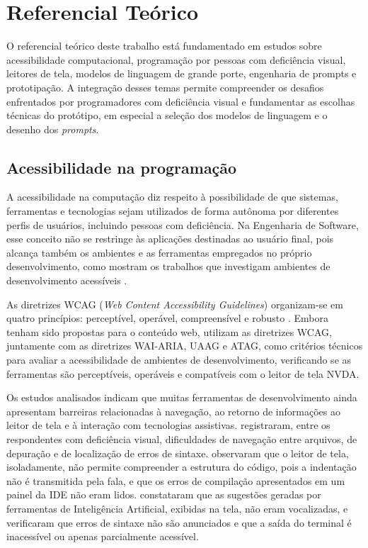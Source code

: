 \documentclass[
    12pt,                   %
    openright,              %
    oneside,                %
    a4paper,                %
    sumario=tradicional,    %
    english,                %
    brazil,                 %
    ]{abntex2}
\begin{document}
\chapter{Referencial Teórico}\label{sec:refteorico}

O referencial teórico deste trabalho está fundamentado em estudos sobre acessibilidade computacional, programação por pessoas com deficiência visual, leitores de tela, modelos de linguagem de grande porte, engenharia de prompts e prototipação. A integração desses temas permite compreender os desafios enfrentados por programadores com deficiência visual e fundamentar as escolhas técnicas do protótipo, em especial a seleção dos modelos de linguagem e o desenho dos \textit{prompts}.

\section{Acessibilidade na programação}\label{sec:AcessComputacao}

A acessibilidade na computação diz respeito à possibilidade de que sistemas, ferramentas e tecnologias sejam utilizados de forma autônoma por diferentes perfis de usuários, incluindo pessoas com deficiência. Na Engenharia de Software, esse conceito não se restringe às aplicações destinadas ao usuário final, pois alcança também os ambientes e as ferramentas empregados no próprio desenvolvimento, como mostram os trabalhos que investigam ambientes de desenvolvimento acessíveis \cite{latinoware37693,latinoware6969}.

As diretrizes WCAG (\textit{Web Content Accessibility Guidelines}) organizam-se em quatro princípios: perceptível, operável, compreensível e robusto \cite{w3c2024wcag22}. Embora tenham sido propostas para o conteúdo web, \textcite{latinoware6969} utilizam as diretrizes WCAG, juntamente com as diretrizes WAI-ARIA, UAAG e ATAG, como critérios técnicos para avaliar a acessibilidade de ambientes de desenvolvimento, verificando se as ferramentas são perceptíveis, operáveis e compatíveis com o leitor de tela NVDA.

Os estudos analisados indicam que muitas ferramentas de desenvolvimento ainda apresentam barreiras relacionadas à navegação, ao retorno de informações ao leitor de tela e à interação com tecnologias assistivas. \textcite{latinoware20457} registraram, entre os respondentes com deficiência visual, dificuldades de navegação entre arquivos, de depuração e de localização de erros de sintaxe. \textcite{acad54431201} observaram que o leitor de tela, isoladamente, não permite compreender a estrutura do código, pois a indentação não é transmitida pela fala, e que os erros de compilação apresentados em um painel da IDE não eram lidos. \textcite{latinoware34224} constataram que as sugestões geradas por ferramentas de Inteligência Artificial, exibidas na tela, não eram vocalizadas, e \textcite{latinoware6969} verificaram que erros de sintaxe não são anunciados e que a saída do terminal é inacessível ou apenas parcialmente acessível.
\end{document}
